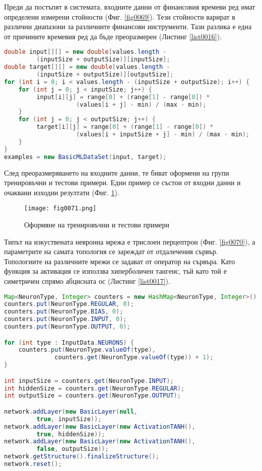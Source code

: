 Преди да постъпят в системата, входните данни от финансовия времеви ред имат определени измерени стойности (Фиг. \ref{fig0069}). Тези стойности варират в различни диапазони за различните финансови инструменти. Тази разлика е една от причините времевия ред да бъде преоразмерен (Листинг \ref{list0016}).

\begin{lstlisting}[caption=Преоразмеряване на входните данни, language=Java, basicstyle=\tiny, label=list0016]
double input[][] = new double[values.length -
		 (inputSize + outputSize)][inputSize];
double target[][] = new double[values.length -
		 (inputSize + outputSize)][outputSize];
for (int i = 0; i < values.length - (inputSize + outputSize); i++) {
	for (int j = 0; j < inputSize; j++) {
		 input[i][j] = range[0] + (range[1] - range[0]) *
					(values[i + j] - min) / (max - min);
	}
	for (int j = 0; j < outputSize; j++) {
		 target[i][j] = range[0] + (range[1] - range[0]) *
					(values[i + inputSize + j] - min) / (max - min);
	}
}
examples = new BasicMLDataSet(input, target);
\end{lstlisting}

След преоразмеряването на входните данни, те биват оформени на групи тренировъчни и тестови примери. Един пример се състои от входни данни и очаквани изходни резултати (Фиг. \ref{fig0071}).

\begin{figure}[H]
  \centering
  \texttt{[image: fig0071.png]}
  \caption{Оформяне на тренировъчни и тестови примери}
\label{fig0071}
\end{figure}

Типът на изкуствената невронна мрежа е трислоен перцептрон (Фиг. \ref{fig0070}), а параметрите на самата топология се зареждат от отдалечения сървър. Топологиите на различните мрежи се задават от оператор на сървъра. Като функция за активация се използва хиперболичен тангенс, тъй като той е симетричен спрямо абцисната ос (Листинг \ref{list0017}).

\begin{lstlisting}[caption=Конструиране на изкуствена невронна мрежа, language=Java, basicstyle=\tiny, label=list0017]
Map<NeuronType, Integer> counters = new HashMap<NeuronType, Integer>();
counters.put(NeuronType.REGULAR, 0);
counters.put(NeuronType.BIAS, 0);
counters.put(NeuronType.INPUT, 0);
counters.put(NeuronType.OUTPUT, 0);

for (int type : InputData.NEURONS) {
	counters.put(NeuronType.valueOf(type),
			  counters.get(NeuronType.valueOf(type)) + 1);
}

int inputSize = counters.get(NeuronType.INPUT);
int hiddenSize = counters.get(NeuronType.REGULAR);
int outputSize = counters.get(NeuronType.OUTPUT);

network.addLayer(new BasicLayer(null,
		 true, inputSize));
network.addLayer(new BasicLayer(new ActivationTANH(),
		 true, hiddenSize));
network.addLayer(new BasicLayer(new ActivationTANH(),
		 false, outputSize));
network.getStructure().finalizeStructure();
network.reset();
\end{lstlisting}

